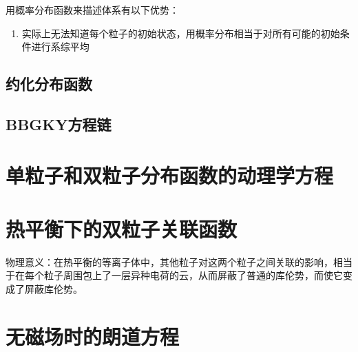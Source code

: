 用概率分布函数来描述体系有以下优势：
\begin{enumerate}
    \item 实际上无法知道每个粒子的初始状态，用概率分布相当于对所有可能的初始条件进行系综平均
\end{enumerate}

\subsection{约化分布函数}

\subsection{BBGKY方程链}

\section{单粒子和双粒子分布函数的动理学方程}

\section{热平衡下的双粒子关联函数}

物理意义：在热平衡的等离子体中，其他粒子对这两个粒子之间关联的影响，相当于在每个粒子周围包上了一层异种电荷的云，从而屏蔽了普通的库伦势，而使它变成了屏蔽库伦势。

\section{无磁场时的朗道方程}
